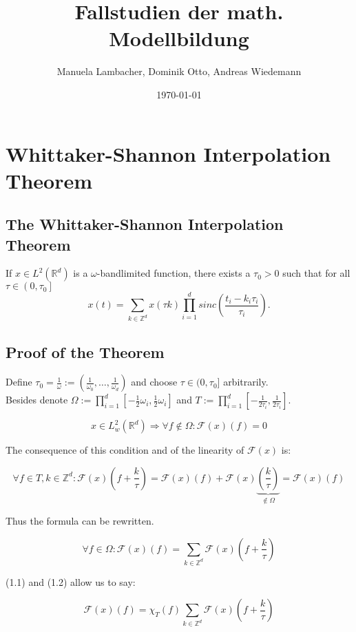 \documentclass[a4paper, 11pt]{scrreprt}
\title{Fallstudien der math. Modellbildung}
\author{Manuela Lambacher, Dominik Otto, Andreas Wiedemann}
\date{\today}
\newcommand{\RR}{\mathbb{R}}
\newcommand{\ZZ}{\mathbb{Z}}
\newcommand{\FF}{\mathcal{F}}
\begin{document}
\parindent 0pt
\maketitle
\tableofcontents

\chapter{Whittaker-Shannon Interpolation Theorem}

\section{The Whittaker-Shannon Interpolation Theorem}
If \(x \in L^2(\RR^d)\) is a \(\omega\)-bandlimited function, there exists a \(\tau_0 > 0\) such that for all \(\tau \in \left(0,\tau_0\right]\)
\[x(t) = \sum_{k \in \ZZ^d} x(\tau k) \prod_{i=1}^d sinc\left(\frac{t_i-k_i \tau_i}{\tau_i}\right).\]

\section{Proof of the Theorem}
Define \(\tau_0 = \frac{1}{\omega} := \left(\frac{1}{\omega_0}, \ldots, \frac{1}{\omega_d}\right)\) and choose \(\tau \in (0,\tau_0]\) arbitrarily. \\
Besides denote \(\Omega := \prod_{i=1}^d \left[-\frac{1}{2}\omega_i ,\frac{1}{2}\omega_i\right]\) and \(T := \prod_{i=1}^d \left[-\frac{1}{2\tau_i} ,\frac{1}{2\tau_i}\right]\).

\begin{equation}
x \in L^2_w(\RR^d) \Rightarrow \forall f\notin \Omega: \FF(x)(f) = 0
\end{equation}

The consequence of this condition and of the linearity of \(\FF(x)\) is:

\[\forall f\in T, k \in \ZZ^d: \FF(x)\left(f+\frac{k}{\tau}\right) = \FF(x)(f) + \FF(x)\underbrace{\left(\frac{k}{\tau}\right)}_{\notin \Omega} = \FF(x)(f)\]

Thus the formula can be rewritten.

\begin{equation}
\forall f \in \Omega: \FF(x)(f) = \sum_{k \in \ZZ^d} \FF(x)\left( f+\frac{k}{\tau}\right)
\end{equation} 

(1.1) and (1.2) allow us to say:

\[\FF(x)(f) = \chi_{T}(f) \sum_{k \in \ZZ^d} \FF(x)\left(f+\frac{k}{\tau}\right)\]
\end{document}
